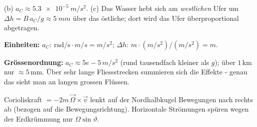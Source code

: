 \begin{ergebnis}
(b) $a_C\approx\qty{5.3e-5}{m/s^2}$. (c) Das Wasser hebt sich am
\emph{westlichen} Ufer um $\Delta h
=B\,a_C/g\approx\qty{5}{mm}$ über das östliche; dort wird das Ufer
überproportional abgetragen.
\end{ergebnis}

\begin{kontrolle}
\textbf{Einheiten:} $a_C$: $\mathrm{rad/s}\cdot m/s = m/s^2$; $\Delta h$:
$m\cdot(m/s^2)/(m/s^2)=m$. \checkmark

\textbf{Grössenordnung:} $a_C\approx 5e-5\,m/s^2$ (rund tausendfach kleiner als
$g$); über $1$\,km nur $\approx5$\,mm. Über sehr lange Fliessstrecken summieren
sich die Effekte - genau das sieht man an langen grossen Flüssen.
\end{kontrolle}

\begin{merksatz}
Corioliskraft $=-2m\,\vec\Omega\times\vec v$ lenkt auf der Nordhalbkugel
Bewegungen nach rechts ab (bezogen auf die Bewegungsrichtung). Horizontale
Strömungen spüren wegen der Erdkrümmung nur $\Omega\sin\vartheta$.
\end{merksatz}